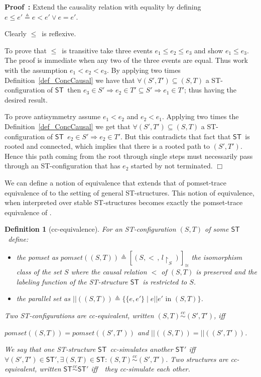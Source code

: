 \documentclass[submission,copyright,creativecommons]{eptcs}
\newtheorem{definition}[theorem]{Definition}
\newenvironment{proof}[1][\!\!\,]{\vspace{1ex}\noindent\textbf{Proof #1: }}{\hfill$\Box$\vspace{2ex}}
\newcommand\defequal{\ensuremath{\stackrel{\vartriangle}{=}}}
\newcommand\ST{\ensuremath{\mathsf{ST}}}
\newcommand\isomorphic{\ensuremath{\cong}}
\newcommand\parallelSet[1]{\ensuremath{||(#1)}}
\newcommand\pomset[1]{\ensuremath{\mathit{pomset}(#1)}}
\newcommand\ccequiv{\ensuremath{\stackrel{cc}{\sim}}}
\newcommand\causes{\ensuremath{<}}
\newcommand\causeseq{\ensuremath{\leq}}
\begin{document}
\begin{proof}
Extend the causality relation with equality by defining $e\causeseq e'\defequal e\causes e' \vee e=e'$.

Clearly \causeseq\ is reflexive.

To prove that \causeseq\ is transitive take three events $e_{1}\causeseq e_{2}\causeseq e_{3}$ and show $e_{1}\causeseq e_{3}$. The proof is immediate when any two of the three events are equal. Thus work with the assumption $e_{1}\causes e_{2}\causes e_{3}$. By applying two times Definition~\ref{def_ConcCausal} we have that $\forall(S',T')\subseteq(S,T)$ a ST-configuration of \ST\ then $e_{3}\in S'\Rightarrow e_{2}\in T'\subseteq S'\Rightarrow e_{1}\in T'$; thus having the desired result.

To prove antisymmetry assume $e_{1}\causes e_{2}$ and $e_{2}\causes e_{1}$. Applying two times the Definition~\ref{def_ConcCausal} we get that $\forall(S',T')\subseteq(S,T)$ a ST-configuration of \ST\ $e_{2}\in S'\Rightarrow e_{2}\in T'$. But this contradicts that fact that \ST\ is rooted and connected, which implies that there is a rooted path to $(S',T')$. Hence this path coming from the root through single steps must necessarily pass through an ST-configuration that has $e_{2}$ started by not terminated.
\end{proof}



We can define a notion of equivalence that extends that of pomset-trace equivalence of \cite{GlabbeekV97splitting,GlabbeekG01refinement} to the setting of general ST-structures. This notion of equivalence, when interpreted over stable ST-structures becomes exactly the pomset-trace equivalence of \cite{GlabbeekG01refinement}.

\begin{definition}[cc-equivalence]\label{def_cc_equiv}
For an ST-configuration $(S,T)$ of some \ST\ define:
\begin{itemize}
\item the \emph{pomset} as $\pomset{(S,T)}\defequal[(S,\causes\,,\,l\!\!\upharpoonright_{S})]_{\isomorphic}$ the isomorphism class of the set $S$ where the causal relation $\causes$ of $(S,T)$ is preserved and the labeling function of the ST-structure \ST\ is restricted to $S$.

\item the \emph{parallel set} as $\parallelSet{(S,T)}\defequal\{\{e,e'\}\mid e||e'\mbox{ in }(S,T)\}$.
\end{itemize}
Two ST-configurations are cc-equivalent, written $(S,T)\ccequiv(S',T')$, iff

\centerline{$\pomset{(S,T)}=\pomset{(S',T')}$ and $\parallelSet{(S,T)}=\parallelSet{(S',T')}$.}

\noindent We say that one ST-structure \ST\ cc-simulates another $\ST'$ iff\ \ $\forall (S',T')\in\ST',\exists (S,T)\in\ST:(S,T)\ccequiv(S',T')$. Two structures are cc-equivalent, written $\ST\ccequiv\ST'$ iff\ \ they cc-simulate each other.
\end{definition}
\end{document}
